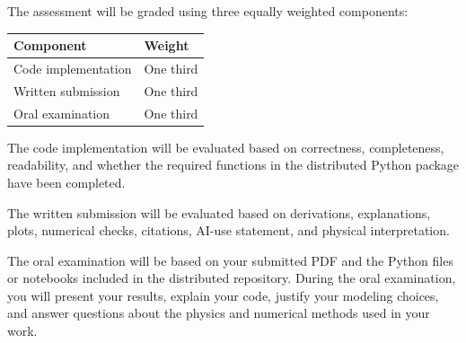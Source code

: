The assessment will be graded using three equally weighted components:

\begin{center}
\begin{tabular}{ll}
\toprule
Component & Weight \\
\midrule
Code implementation & One third \\
Written submission & One third \\
Oral examination & One third \\
\bottomrule
\end{tabular}
\end{center}

The code implementation will be evaluated based on correctness, completeness, readability, and whether the required functions in the distributed Python package have been completed.

The written submission will be evaluated based on derivations, explanations, plots, numerical checks, citations, AI-use statement, and physical interpretation.

The oral examination will be based on your submitted PDF and the Python files or notebooks included in the distributed repository. During the oral examination, you will present your results, explain your code, justify your modeling choices, and answer questions about the physics and numerical methods used in your work.